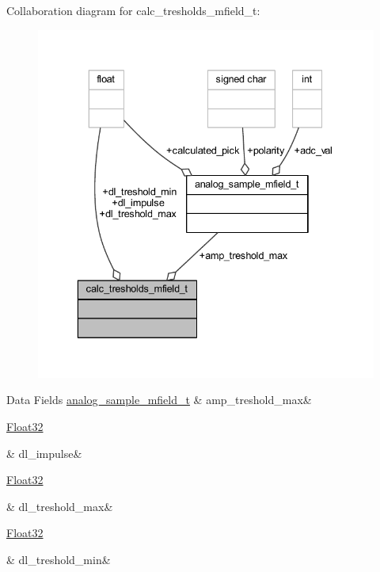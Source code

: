 Collaboration diagram for calc\+\_\+tresholds\+\_\+mfield\+\_\+t\+:\nopagebreak
\begin{figure}[H]
\begin{center}
\leavevmode
\includegraphics[width=336pt]{df/dc6/a00949}
\end{center}
\end{figure}
\begin{DoxyFields}{Data Fields}
\hypertarget{a00019_a1a6df58a4de80d8c64fc97c517db3d13}{\hyperlink{a00019_d4/d81/a00110}{analog\+\_\+sample\+\_\+mfield\+\_\+t}}\label{a00019_a1a6df58a4de80d8c64fc97c517db3d13}
&
amp\+\_\+treshold\+\_\+max&
\\
\hline

\hypertarget{a00019_a5a7c9d8495de198c019659cce3aacf3b}{\hyperlink{a00072_a87d38f886e617ced2698fc55afa07637}{Float32}}\label{a00019_a5a7c9d8495de198c019659cce3aacf3b}
&
dl\+\_\+impulse&
\\
\hline

\hypertarget{a00019_a7d2a0ec3c4d71f0893b36b4cea791626}{\hyperlink{a00072_a87d38f886e617ced2698fc55afa07637}{Float32}}\label{a00019_a7d2a0ec3c4d71f0893b36b4cea791626}
&
dl\+\_\+treshold\+\_\+max&
\\
\hline

\hypertarget{a00019_a09fa95dca161334a339db80a4dfe18c9}{\hyperlink{a00072_a87d38f886e617ced2698fc55afa07637}{Float32}}\label{a00019_a09fa95dca161334a339db80a4dfe18c9}
&
dl\+\_\+treshold\+\_\+min&
\\
\hline

\end{DoxyFields}
\label{d2/d5e/a00860}
\hypertarget{a00019_d2/d5e/a00860}{}
